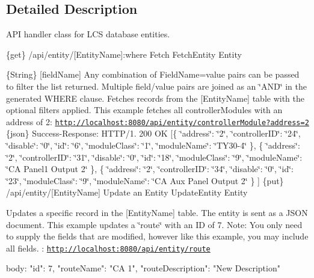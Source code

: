 \subsection{Detailed Description}
A\+PI handler class for L\+CS database entities. 

\{get\} /api/entity/\mbox{[}Entity\+Name\mbox{]}\+:where Fetch  Fetch\+Entity  Entity

\{String\} \mbox{[}field\+Name\mbox{]} Any combination of Field\+Name=value pairs can be passed to filter the list returned. Multiple field/value pairs are joined as an \char`\"{}\+A\+N\+D\char`\"{} in the generated W\+H\+E\+RE clause.  Fetches records from the \mbox{[}Entity\+Name\mbox{]} table with the optional filters applied.  This example fetches all controller\+Modules with an address of 2\+: \href{http://localhost:8080/api/entity/controllerModule?address=2}{\tt http\+://localhost\+:8080/api/entity/controller\+Module?address=2}  \{json\} Success-\/\+Response\+: H\+T\+T\+P/1. 200 OK \mbox{[}\{ \char`\"{}address\char`\"{}\+: \char`\"{}2\char`\"{}, \char`\"{}controller\+I\+D\char`\"{}\+: \char`\"{}24\char`\"{}, \char`\"{}disable\char`\"{}\+: \char`\"{}0\char`\"{}, \char`\"{}id\char`\"{}\+: \char`\"{}6\char`\"{}, \char`\"{}module\+Class\char`\"{}\+: \char`\"{}1\char`\"{}, \char`\"{}module\+Name\char`\"{}\+: \char`\"{}\+T\+Y30-\/4\char`\"{} \}, \{ \char`\"{}address\char`\"{}\+: \char`\"{}2\char`\"{}, \char`\"{}controller\+I\+D\char`\"{}\+: \char`\"{}31\char`\"{}, \char`\"{}disable\char`\"{}\+: \char`\"{}0\char`\"{}, \char`\"{}id\char`\"{}\+: \char`\"{}18\char`\"{}, \char`\"{}module\+Class\char`\"{}\+: \char`\"{}9\char`\"{}, \char`\"{}module\+Name\char`\"{}\+: \char`\"{}\+C\+A Panel1 Output 2\char`\"{} \}, \{ \char`\"{}address\char`\"{}\+: \char`\"{}2\char`\"{}, \char`\"{}controller\+I\+D\char`\"{}\+: \char`\"{}34\char`\"{}, \char`\"{}disable\char`\"{}\+: \char`\"{}0\char`\"{}, \char`\"{}id\char`\"{}\+: \char`\"{}23\char`\"{}, \char`\"{}module\+Class\char`\"{}\+: \char`\"{}9\char`\"{}, \char`\"{}module\+Name\char`\"{}\+: \char`\"{}\+C\+A Aux Panel Output 2\char`\"{} \} \mbox{]}  \{put\} /api/entity/\mbox{[}Entity\+Name\mbox{]} Update an Entity  Update\+Entity  Entity

Updates a specific record in the \mbox{[}Entity\+Name\mbox{]} table. The entity is sent as a J\+S\+ON document.  This example updates a \char`\"{}route\char`\"{} with an ID of 7. Note\+: You only need to supply the fields that are modified, however like this example, you may include all fields. \+: \href{http://localhost:8080/api/entity/route}{\tt http\+://localhost\+:8080/api/entity/route} \begin{DoxyVerb}body:
{
  "id": 7,
  "routeName": "CA 1",
  "routeDescription": "New Description"
}\end{DoxyVerb}


